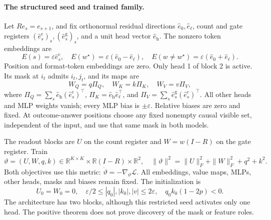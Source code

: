 \paragraph{The structured seed and trained family.}\label{sec:seed}
Let $R e_s=e_{s+1}$, and fix orthonormal residual directions $\hat e_0,\hat e_\ell$, count and gate registers $(\hat e_s^{\mathrm c})_s,(\hat e_s^{\mathrm g})_s$, and a unit head vector $\hat e_{\mathrm h}$. The nonzero token embeddings are
\[
E(s)=\varepsilon\hat e_s^{\mathrm c},\quad
E(w^\star)=\varepsilon(\hat e_0-\hat e_\ell),\quad
E(w\ne w^\star)=\varepsilon(\hat e_0+\hat e_\ell).
\]
Position and format-token embeddings are zero. Only head 1 of block 2 is active. Its mask at $i_t$ admits $i_t,j_t$, and its maps are
\begin{equation}\label{eq:seedmaps}
W_Q=q\Pi_Q,\quad W_K=k\Pi_K,\quad W_V=v\Pi_V,
\end{equation}
where $\Pi_Q=\sum_s\hat e_{\mathrm h}(\hat e_s^{\mathrm c})^\top$, $\Pi_K=\hat e_{\mathrm h}\hat e_\ell^\top$, and $\Pi_V=\sum_s\hat e_s^{\mathrm g}(\hat e_s^{\mathrm c})^\top$. All other heads and MLP weights vanish; every MLP bias is $\pm\varepsilon$. Relative biases are zero and fixed. At outcome-answer positions choose any fixed nonempty causal visible set, independent of the input, and use that same mask in both models.

The readout blocks are $U$ on the count register and $W=w(I-R)$ on the gate register. Train
\begin{equation}\label{eq:metric}
\vartheta=(U,W,q,k)\in\mathbb R^{K\times K}\times\mathbb R(I-R)\times\mathbb R^2,
\quad \|\vartheta\|^2=\|U\|_F^2+\|W\|_F^2+q^2+k^2.
\end{equation}
Both objectives use this metric: $\dot\vartheta=-\nabla_\vartheta\mathcal L$. All embeddings, value maps, MLPs, other heads, masks and biases remain fixed. The initialization is
\begin{equation}\label{eq:init}
U_0=W_0=0,\quad \varepsilon/2\le|q_0|,|k_0|,|v|\le2\varepsilon,
\quad q_0k_0(1-2p)<0.
\end{equation}
The architecture has two blocks, although this restricted seed activates only one head. The positive theorem does not prove discovery of the mask or feature roles.

